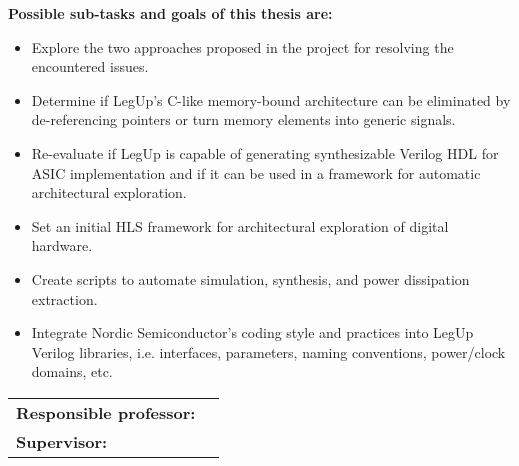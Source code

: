 \begin{titlingpage}
\textbf{Possible sub-tasks and goals of this thesis are:}
\begin{itemize}
    \item Explore the two approaches proposed in the project for resolving the encountered issues.
    \item Determine if LegUp’s C-like memory-bound architecture can be eliminated by de-referencing pointers or turn memory elements into generic signals.
    \item Re-evaluate if LegUp is capable of generating synthesizable Verilog HDL for ASIC implementation and if it can be used in a framework for automatic architectural exploration.
    \item Set an initial HLS framework for architectural exploration of digital hardware.
    \item Create scripts to automate simulation, synthesis, and power dissipation extraction.
    \item Integrate Nordic Semiconductor's coding style and practices into LegUp Verilog libraries, i.e. interfaces, parameters, naming conventions, power/clock domains, etc.
\end{itemize}


\vspace{6ex}

\noindent
\begin{tabular}{@{}p{4cm}l}
\textbf{Responsible professor:} 	& \theprofessor \\
\textbf{Supervisor:}			& \thesupervisor \\
\end{tabular}

\end{titlingpage}